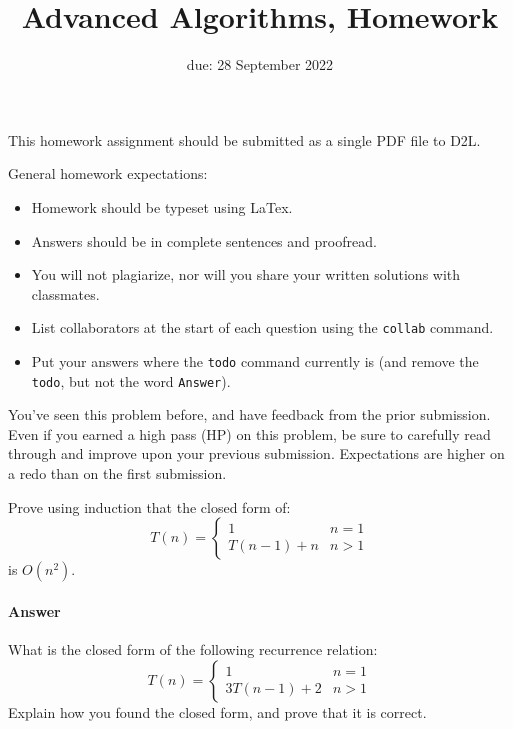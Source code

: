 \documentclass{article}
\title{Advanced Algorithms, Homework \hwnum}
\author{\todo{Your Name Here}}
\date{due: 28 September 2022}
\begin{document}
\maketitle

This homework assignment should be
submitted as a single PDF file to D2L.

General homework expectations:
\begin{itemize}
    \item Homework should be typeset using LaTex.
    \item Answers should be in complete sentences and proofread.
    \item You will not plagiarize, nor will you share your written solutions
        with classmates.
    \item List collaborators at the start of each question using the
        \texttt{collab} command.
    \item Put your answers where the \texttt{todo} command currently is (and
        remove the \texttt{todo}, but not the word \texttt{Answer}).
\end{itemize}

\collab{\todo{}}
You've seen this problem before, and have feedback from the prior submission.
Even if you earned a high pass (HP) on this problem, be sure to carefully read
through and improve upon your previous submission.  Expectations are higher on a
redo than on the first submission.

Prove using induction that the closed form of:
$$T(n) = \begin{cases}
            1        & n=1\\
            T(n-1)+n & n>1
         \end{cases}
$$
is $O(n^2)$.

\paragraph{Answer}


\collab{\todo{}}

What is the closed form of the following recurrence relation:
$$ T(n) = \begin{cases}
            1        & n=1\\
            3T(n-1)+2 & n>1
         \end{cases}
$$
Explain how you found the closed form, and prove that it is correct.
\end{document}
